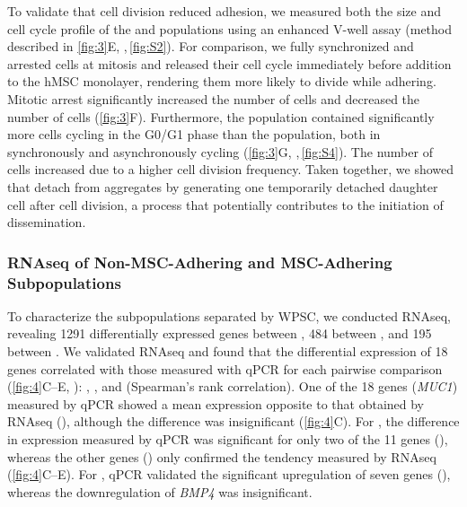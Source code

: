 To validate that cell division reduced adhesion, we measured both the size and
cell cycle profile of the \nMAina and \MAina populations using an enhanced
V-well assay (method described in \autoref{fig:3}E,
,\,\ref{fig:S2}). For comparison, we fully
synchronized and arrested \INA cells at mitosis and released their cell cycle
immediately before addition to the hMSC monolayer, rendering them more likely to
divide while adhering. Mitotic arrest significantly increased the number of
\nMAina cells and decreased the number of \MAina cells (\autoref{fig:3}F).
Furthermore, the \nMAina population contained significantly more cells cycling
in the G0/G1 phase than the \MAina population, both in synchronously and
asynchronously cycling \INA (\autoref{fig:3}G,
,\,\ref{fig:S4}). The number of \nMAina \INA
cells increased due to a higher cell division frequency. Taken together, we
showed that \INA detach from aggregates by generating one temporarily detached
daughter cell after cell division, a process that potentially contributes to the
initiation of dissemination.




\subsubsection*{RNAseq of Non-MSC-Adhering and MSC-Adhering Subpopulations}
To characterize the subpopulations separated by WPSC, we conducted RNAseq,
revealing 1291 differentially expressed genes between \versus{\nMAina}{\CMina},
484 between \versus{\MAina}{\CMina}, and 195 between \versus{\MAina}{\nMAina}. We
validated RNAseq and found that the differential expression of 18 genes
correlated with those measured with qPCR for each pairwise comparison
(\autoref{fig:4}C--E, ):
\versus{\nMAina}{\CMina} ,
\versus{\MAina}{\CMina} , and
\versus{\MAina}{\nMAina} 
(Spearman’s rank correlation). One of the \SI{18}{} genes (\textit{MUC1})
measured by qPCR showed a mean expression opposite to that obtained by RNAseq
(\versus{\nMAina}{\CMina}), although the difference was insignificant
(\autoref{fig:4}C). For \versus{\nMAina}{\CMina}, the difference in expression
measured by qPCR was significant for only two of the 11 genes
(), whereas the other genes () only confirmed the tendency measured by RNAseq
(\autoref{fig:4}C--E). For \versus{\MAina}{\CMina}, qPCR validated the
significant upregulation of seven genes (), whereas the downregulation of \textit{BMP4} was insignificant.




